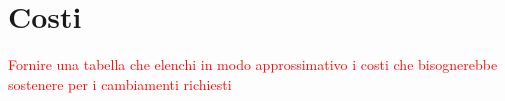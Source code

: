 \newpage

\section{Costi} \label{ref:costi}

\textcolor{red}{Fornire una tabella che elenchi in modo approssimativo i costi che bisognerebbe sostenere per i cambiamenti richiesti}
